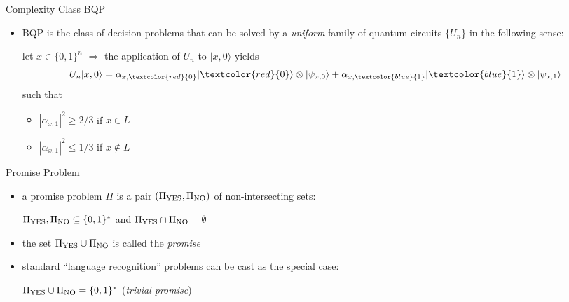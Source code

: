 \documentclass[slideColor]{prosper}
\renewcommand{\>}{\rangle}
\newcommand{\<}{\langle}
\begin{document}
\begin{slide}{Complexity Class BQP}

\begin{itemize}
\item BQP is the class of decision problems that can be solved by a {\em uniform} family of quantum circuits $\{U_n\}$ in the following sense:

\bigskip
let $x\in\{0,1\}^n$ $\Rightarrow$
the application of $U_n$ to $|x,0\>$ yields
\[
U_n |x,0\> = 
\alpha_{x,\textcolor{red}{0}}|\textcolor{red}{0}\> \otimes |\psi_{x,0}\> + 
\alpha_{x,\textcolor{blue}{1}}|\textcolor{blue}{1}\> \otimes |\psi_{x,1}\>
\]
such that 

\medskip
\begin{itemize}
\item $|\alpha_{x,1}|^2\ge 2/3$ if $x\in L$
\item $|\alpha_{x,1}|^2\le 1/3$ if $x\not\in L$
\end{itemize}
\end{itemize}
\end{slide}


\begin{slide}{Promise Problem}

\begin{itemize}
\item a promise problem $\Pi$ is a pair $(\Pi_{\rm YES},\Pi_{\rm NO})$ of non-intersecting sets: 

\medskip
$\Pi_{\rm YES},\Pi_{\rm NO}\subseteq\{0,1\}^*$ and $\Pi_{\rm YES}\cap\Pi_{\rm NO}=\emptyset$

\bigskip
\item
the set $\Pi_{\rm YES}\cup\Pi_{\rm NO}$ is called the {\em promise}

\bigskip
\item
standard ``language recognition'' problems can be cast as the special case:

\medskip
$\Pi_{\rm YES}\cup\Pi_{\rm NO}=\{0,1\}^*$ ({\em trivial promise})
\end{itemize}
\end{slide}

\end{document}
